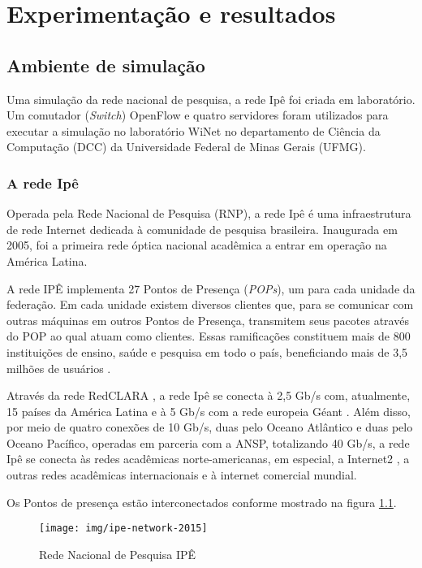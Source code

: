 \chapter{Experimentação e resultados}
\label{cap:experiments}

\section{Ambiente de simulação}

Uma simulação da rede nacional de pesquisa, a rede Ipê \citep{ipe2015network} 
foi criada em laboratório.
Um comutador (\emph{Switch}) OpenFlow e quatro servidores foram utilizados 
para executar a simulação no laboratório WiNet \citep{winet22015lab}
no departamento de Ciência da Computação (DCC) da Universidade Federal 
de Minas Gerais (UFMG).

\subsection{A rede Ipê}
Operada pela Rede Nacional de Pesquisa (RNP), a rede Ipê é uma infraestrutura
de rede Internet dedicada à comunidade de pesquisa brasileira.
Inaugurada em 2005, foi a primeira rede óptica nacional acadêmica a entrar em
operação na América Latina.

A rede IPÊ implementa 27 Pontos de Presença (\emph{POPs}), um para cada unidade
da federação.
Em cada unidade existem diversos clientes que, para se comunicar com outras 
máquinas em outros Pontos de Presença, transmitem seus pacotes através do 
POP ao qual atuam como clientes.
Essas ramificações constituem mais de 800 instituições de ensino, saúde e 
pesquisa em todo o país, beneficiando mais de 3,5 milhões de usuários
\citep{ipe2015network}.

Através da rede RedCLARA \citep{redclara2015network}, a rede Ipê se conecta 
à 2,5 Gb/s com, atualmente, 15 países da América Latina e à 5 Gb/s com a rede
europeia Géant \citep{geant2015network}. 
Além disso, por meio de quatro conexões de
10 Gb/s, duas pelo Oceano Atlântico e duas pelo Oceano Pacífico, 
operadas em parceria com a ANSP, totalizando 40 Gb/s, a rede Ipê se conecta 
às redes acadêmicas norte-americanas, em especial, a  Internet2 
\citep{internet22015network}, a outras redes acadêmicas internacionais e à 
internet comercial mundial.

Os Pontos de presença estão interconectados conforme mostrado na figura 
\ref{fig:ipe-network-2015}.

\begin{figure}[!ht]
    \centering
    \label{fig:ipe-network-2015}
    \texttt{[image: img/ipe-network-2015]}
    \caption{Rede Nacional de Pesquisa IPÊ \protect\footnotemark}
    \vspace*{3in}
\end{figure}

